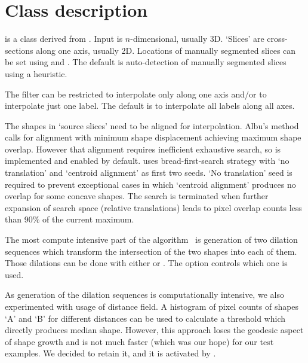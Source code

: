 \documentclass{InsightArticle}
\begin{document}
\section{Class description}

 is a class derived from
.
Input is $n$-dimensional, usually 3D.
`Slices' are cross-sections along one axis, usually 2D.
Locations of manually segmented slices can be set using
 and .
The default is auto-detection of manually segmented slices using a heuristic.

The filter can be restricted to interpolate only along one axis
and/or to interpolate just one label.
The default is to interpolate all labels along all axes.

The shapes in `source slices' need to be aligned for interpolation.
Albu's method calls for alignment with
minimum shape displacement achieving maximum shape overlap.
However that alignment requires inefficient exhaustive search,
so  is implemented and enabled by default.
 uses bread-first-search strategy
with `no translation' and `centroid alignment' as first two seeds.
`No translation' seed is required to prevent exceptional cases in which
`centroid alignment' produces no overlap for some concave shapes.
The search is terminated when further expansion of search space
(relative translations) leads to pixel overlap counts
less than 90\% of the current maximum.

The most compute intensive part of the algorithm~\cite{Albu2008}
is generation of two dilation sequences which transform the intersection
of the two shapes into each of them.
Those dilations can be done with either 
or .
The option  controls which one is used.

As generation of the dilation sequences is computationally intensive,
we also experimented with usage of distance field.
A histogram of pixel counts of shapes `A' and `B' for different distances
can be used to calculate a threshold which directly produces median shape.
However, this approach loses the geodesic aspect of shape growth and
is not much faster (which was our hope) for our test examples.
We decided to retain it, and it is activated by .
\end{document}
